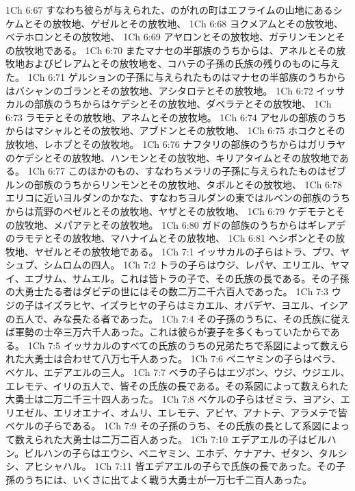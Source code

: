 1Ch 6:67  すなわち彼らが与えられた、のがれの町はエフライムの山地にあるシケムとその放牧地、ゲゼルとその放牧地、
1Ch 6:68  ヨクメアムとその放牧地、ベテホロンとその放牧地、
1Ch 6:69  アヤロンとその放牧地、ガテリンモンとその放牧地である。
1Ch 6:70  またマナセの半部族のうちからは、アネルとその放牧地およびビレアムとその放牧地を、コハテの子孫の氏族の残りのものに与えた。
1Ch 6:71  ゲルションの子孫に与えられたものはマナセの半部族のうちからはバシャンのゴランとその放牧地、アシタロテとその放牧地。
1Ch 6:72  イッサカルの部族のうちからはケデシとその放牧地、ダベラテとその放牧地、
1Ch 6:73  ラモテとその放牧地、アネムとその放牧地。
1Ch 6:74  アセルの部族のうちからはマシャルとその放牧地、アブドンとその放牧地、
1Ch 6:75  ホコクとその放牧地、レホブとその放牧地。
1Ch 6:76  ナフタリの部族のうちからはガリラヤのケデシとその放牧地、ハンモンとその放牧地、キリアタイムとその放牧地である。
1Ch 6:77  このほかのもの、すなわちメラリの子孫に与えられたものはゼブルンの部族のうちからリンモンとその放牧地、タボルとその放牧地、
1Ch 6:78  エリコに近いヨルダンのかなた、すなわちヨルダンの東ではルベンの部族のうちからは荒野のベゼルとその放牧地、ヤザとその放牧地、
1Ch 6:79  ケデモテとその放牧地、メパアテとその放牧地。
1Ch 6:80  ガドの部族のうちからはギレアデのラモテとその放牧地、マハナイムとその放牧地、
1Ch 6:81  ヘシボンとその放牧地、ヤゼルとその放牧地である。
1Ch 7:1  イッサカルの子らはトラ、プワ、ヤシュブ、シムロムの四人。
1Ch 7:2  トラの子らはウジ、レパヤ、エリエル、ヤマイ、エブサム、サムエル。これは皆トラの子で、その氏族の長である。その子孫の大勇士たる者はダビデの世にはその数二万二千六百人であった。
1Ch 7:3  ウジの子はイズラヒヤ、イズラヒヤの子らはミカエル、オバデヤ、ヨエル、イシアの五人で、みな長たる者であった。
1Ch 7:4  その子孫のうちに、その氏族に従えば軍勢の士卒三万六千人あった。これは彼らが妻子を多くもっていたからである。
1Ch 7:5  イッサカルのすべての氏族のうちの兄弟たちで系図によって数えられた大勇士は合わせて八万七千人あった。
1Ch 7:6  ベニヤミンの子らはベラ、ベケル、エデアエルの三人。
1Ch 7:7  ベラの子らはエヅボン、ウジ、ウジエル、エレモテ、イリの五人で、皆その氏族の長である。その系図によって数えられた大勇士は二万二千三十四人あった。
1Ch 7:8  ベケルの子らはゼミラ、ヨアシ、エリエゼル、エリオエナイ、オムリ、エレモテ、アビヤ、アナトテ、アラメテで皆ベケルの子らである。
1Ch 7:9  その子孫のうち、その氏族の長として系図によって数えられた大勇士は二万二百人あった。
1Ch 7:10  エデアエルの子はビルハン。ビルハンの子らはエウシ、ベニヤミン、エホデ、ケナアナ、ゼタン、タルシシ、アヒシャハル。
1Ch 7:11  皆エデアエルの子らで氏族の長であった。その子孫のうちには、いくさに出てよく戦う大勇士が一万七千二百人あった。
